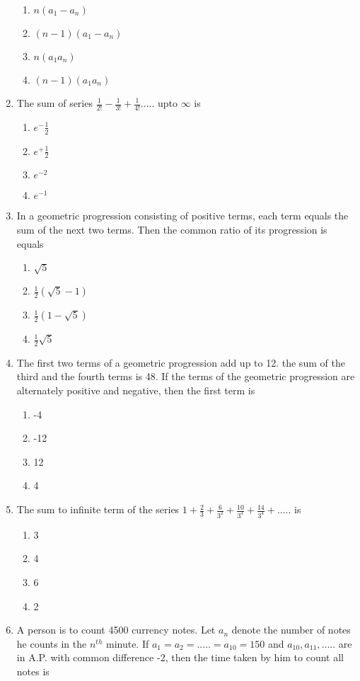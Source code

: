 \begin{enumerate}[label=\arabic*.,ref=\thesubsection.\theenumi]
\begin{enumerate}
\item $n(a_1 -a_n)$
\item $(n-1)(a_1 -a_n)$
\item $n(a_1a_n)$
\item $(n-1)(a_1a_n)$
\end{enumerate}
\item The sum of series $\frac{1}{2!}-\frac{1}{3!}+\frac{1}{4!}.....$ upto $\infty$ is 
\begin{enumerate}
\item $e^-\frac{1}{2}$
\item $e^+\frac{1}{2}$
\item $e^{-2}$
\item $e^{-1}$
\end{enumerate}
\item In a geometric progression consisting of positive terms, each term equals the sum of the next two terms. Then the common ratio of its progression is equals
\begin{enumerate}
\item $\sqrt{5}$
\item $\frac{1}{2}(\sqrt{5} - 1)$
\item $\frac{1}{2}(1-\sqrt{5})$
\item $\frac{1}{2}\sqrt{5}$
\end{enumerate}
\item The first two terms of a geometric progression add up to 12. the sum of the third and the fourth terms is 48. If the terms of the geometric progression are alternately positive and negative, then the first term is
\begin{enumerate}
\item -4
\item -12
\item 12
\item 4
\end{enumerate}
\item The sum to infinite term of the series $1+\frac{2}{3}+\frac{6}{3^2}+\frac{10}{3^3}+\frac{14}{3^4}+.....$ is 
\begin{enumerate}
\item 3
\item 4
\item 6
\item 2
\end{enumerate}
\item A person is to count 4500 currency notes. Let $a_n$ denote the number of notes he counts in the $n^{th}$ minute. If $a_1=a_2=.....=a_{10}=150$ and $a_{10},a_{11},.....$ are in A.P. with common difference -2, then the time taken by him to count all notes is

\end{enumerate}
